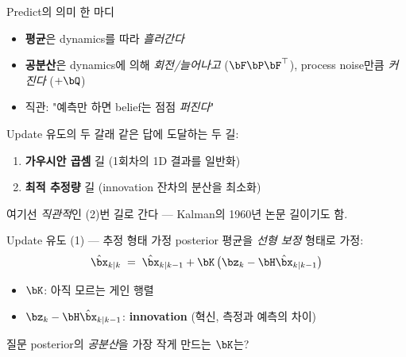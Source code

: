 \begin{frame}{Predict의 의미 한 마디}
  \begin{itemize}
    \item \textbf{평균}은 dynamics를 따라 \emph{흘러간다}
    \item \textbf{공분산}은 dynamics에 의해 \emph{회전/늘어나고} ($\bF \bP \bF^\top$), process noise만큼 \emph{커진다} ($+\bQ$)
    \item 직관: "예측만 하면 belief는 점점 \emph{퍼진다}"
  \end{itemize}
  \pause
  \vspace{0.4em}
  \begin{center}
  \end{center}
\end{frame}

\begin{frame}{Update 유도의 두 갈래}
  같은 답에 도달하는 두 길:
  \begin{enumerate}
    \item \textbf{가우시안 곱셈} 길 (1회차의 1D 결과를 일반화)
    \item \textbf{최적 추정량} 길 (innovation 잔차의 분산을 최소화)
  \end{enumerate}
  \pause
  \vspace{0.4em}
  여기선 \emph{직관적}인 (2)번 길로 간다 — Kalman의 1960년 논문 길이기도 함.
\end{frame}

\begin{frame}{Update 유도 (1) — 추정 형태 가정}
  posterior 평균을 \emph{선형 보정} 형태로 가정:
  \[
    \hat\bx_{k|k} \;=\; \hat\bx_{k|k-1} + \bK\,\bigl(\bz_k - \bH \hat\bx_{k|k-1}\bigr)
  \]
  \begin{itemize}
    \item $\bK$: 아직 모르는 게인 행렬
    \item $\bz_k - \bH \hat\bx_{k|k-1}$: \textbf{innovation} (혁신, 측정과 예측의 차이)
  \end{itemize}
  \pause
  \vspace{0.3em}
  \begin{block}{질문}
    posterior의 \emph{공분산}을 가장 작게 만드는 $\bK$는?
  \end{block}
\end{frame}

